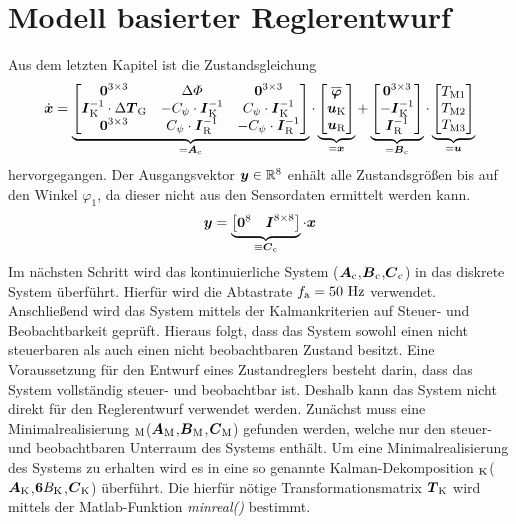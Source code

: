 \section{Modell basierter Reglerentwurf}
Aus dem letzten Kapitel ist die Zustandsgleichung
\begin{equation}
\dot{\boldsymbol{x}} = \underbrace{\begin{bmatrix}
\boldsymbol{0}^{3\times 3} & \Delta\varPhi & \boldsymbol{0}^{3\times 3} 
\\
\boldsymbol{I}_{\text{K}}^{-1}\cdot\Delta\boldsymbol{T}_{\text{G}} & -C_{\psi}\cdot\boldsymbol{I}^{-1}_{\text{K}} & C_{\psi}\cdot\boldsymbol{I}^{-1}_{\text{K}}
\\
\boldsymbol{0}^{3\times 3} & C_{\psi}\cdot\boldsymbol{I}^{-1}_{\text{R}} & -C_{\psi}\cdot\boldsymbol{I}^{-1}_{\text{R}}
\end{bmatrix}}_{=\boldsymbol{A}_{\text{c}}} \cdot \underbrace{\begin{bmatrix}
\boldsymbol{\overline{\varphi}} 
\\
\boldsymbol{u}_{\text{K}} \\
\boldsymbol{u}_{\text{R}}
\end{bmatrix}}_{=\boldsymbol{x}}
+
\underbrace{\begin{bmatrix}
\boldsymbol{0}^{3\times 3}
\\
-\boldsymbol{I}^{-1}_{\text{K}}
\\
\boldsymbol{I}^{-1}_{\text{R}}
\end{bmatrix}}_{=\boldsymbol{B}_{\text{c}}}\cdot \underbrace{\begin{bmatrix}
T_{\text{M1}} \\ T_{\text{M2}} \\ T_{\text{M3}}
\end{bmatrix}}_{=\boldsymbol{u}}
\end{equation}
hervorgegangen. Der Ausgangsvektor $\boldsymbol{y}\in \mathbb{R}^8$ enhält alle Zustandsgrößen bis auf den Winkel $\varphi_1$, da dieser nicht aus den Sensordaten ermittelt werden kann.
\begin{equation}
\boldsymbol{y} = \underbrace{\begin{bmatrix}
\boldsymbol{0}^8 & \boldsymbol{I}^{8\times 8}
\end{bmatrix}}_{\equiv \boldsymbol{C}_{\text{c}}} \cdot \boldsymbol{x}
\end{equation}
Im nächsten Schritt wird das kontinuierliche System ($\boldsymbol{A}_{\text{c}}$,$\boldsymbol{B}_{\text{c}}$,$\boldsymbol{C}_{\text{c}}$) in das diskrete System  überführt. Hierfür wird die Abtastrate $f_{\text{a}} = 50\text{ Hz}$ verwendet.
Anschließend wird das System mittels der Kalmankriterien auf Steuer- und Beobachtbarkeit geprüft. Hieraus folgt, dass das System sowohl einen nicht steuerbaren als auch einen nicht beobachtbaren Zustand besitzt. Eine Voraussetzung für den Entwurf eines Zustandreglers besteht darin, dass das System vollständig steuer- und beobachtbar ist. Deshalb kann das System  nicht direkt für den Reglerentwurf verwendet werden. Zunächst muss eine Minimalrealisierung $_{\text{M}}$($\boldsymbol{A}_{\text{M}}$,$\boldsymbol{B}_{\text{M}}$,$\boldsymbol{C}_{\text{M}}$) gefunden werden, welche nur den steuer- und beobachtbaren Unterraum des Systems enthält. Um eine Minimalrealisierung des Systems zu erhalten wird es in eine so genannte Kalman-Dekomposition $_{\text{K}}$($\boldsymbol{A}_{\text{K}}$,$\boldsymbol{6}{B}_{\text{K}}$,$\boldsymbol{C}_{\text{K}}$) überführt. Die hierfür nötige Transformationsmatrix $\boldsymbol{T}_{\text{K}}$ wird mittels der Matlab-Funktion \textit{minreal()} bestimmt.

